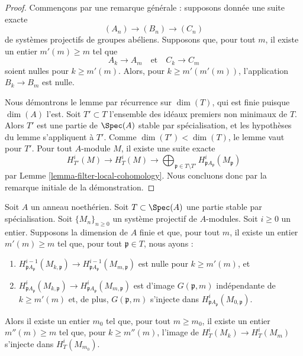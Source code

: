\begin{proof}
Commençons par une remarque générale : supposons donnée une suite
exacte
$$
(A_n) \to (B_n) \to (C_n)
$$
de systèmes projectifs de groupes abéliens. Supposons que, pour tout
$m$, il existe un entier $m'(m) \geq m$ tel que
$$
A_k \to A_m
\quad\text{et}\quad
C_k \to C_m
$$
soient nulles pour $k \geq m'(m)$. Alors, pour $k \geq m'(m'(m))$,
l'application $B_k \to B_m$ est nulle.

\medskip\noindent
Nous démontrons le lemme par récurrence sur $\dim(T)$, qui est
finie puisque $\dim(A)$ l'est. Soit $T' \subset T$
l'ensemble des idéaux premiers non minimaux de $T$. Alors $T'$
est une partie de $\Spec(A)$ stable par spécialisation,
et les hypothèses du lemme s'appliquent à $T'$.
Comme $\dim(T') < \dim(T)$, le lemme vaut pour $T'$.
Pour tout $A$-module $M$, il existe une suite exacte
$$
H^i_{T'}(M) \to H^i_T(M) \to
\bigoplus\nolimits_{\mathfrak p \in T \setminus T'}
H^i_{\mathfrak p A_\mathfrak p}(M_\mathfrak p)
$$
par Lemme \ref{lemma-filter-local-cohomology}.
Nous concluons donc par la remarque initiale de la démonstration.
\end{proof}

\begin{lemma}
\label{lemma-essential-image}
Soit $A$ un anneau noethérien. Soit $T \subset \Spec(A)$ une partie
stable par spécialisation. Soit $\{M_n\}_{n \geq 0}$ un système projectif
de $A$-modules. Soit $i \geq 0$ un entier. Supposons la dimension de $A$
finie et que, pour tout $m$, il existe un entier $m'(m) \geq m$
tel que, pour tout $\mathfrak p \in T$, nous ayons :
\begin{enumerate}
\item $H^{i - 1}_{\mathfrak p A_\mathfrak p}(M_{k, \mathfrak p})
\to H^{i - 1}_{\mathfrak p A_\mathfrak p}(M_{m, \mathfrak p})$
est nulle pour $k \geq m'(m)$, et
\item $ H^i_{\mathfrak p A_\mathfrak p}(M_{k, \mathfrak p}) \to
H^i_{\mathfrak p A_\mathfrak p}(M_{m, \mathfrak p})$
est d'image $G(\mathfrak p, m)$ indépendante de $k \geq m'(m)$ et, de plus,
$G(\mathfrak p, m)$ s'injecte dans
$H^i_{\mathfrak p A_\mathfrak p}(M_{0, \mathfrak p})$.
\end{enumerate}
Alors il existe un entier $m_0$ tel que, pour tout $m \geq m_0$,
il existe un entier $m''(m) \geq m$ tel que,
pour $k \geq m''(m)$, l'image de $H^i_T(M_k) \to H^i_T(M_m)$
s'injecte dans $H^i_T(M_{m_0})$.
\end{lemma}

